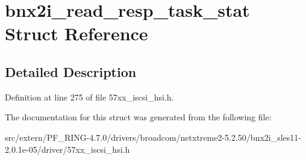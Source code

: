 \hypertarget{structbnx2i__read__resp__task__stat}{
\section{bnx2i\_\-read\_\-resp\_\-task\_\-stat Struct Reference}
\label{structbnx2i__read__resp__task__stat}
}


\subsection{Detailed Description}


Definition at line 275 of file 57xx\_\-iscsi\_\-hsi.h.



The documentation for this struct was generated from the following file:\begin{DoxyCompactItemize}
\item 
src/extern/PF\_\-RING-\/4.7.0/drivers/broadcom/netxtreme2-\/5.2.50/bnx2i\_\-sles11-\/2.0.1e-\/05/driver/57xx\_\-iscsi\_\-hsi.h\end{DoxyCompactItemize}
